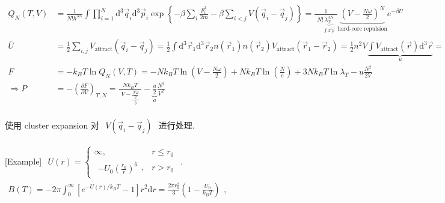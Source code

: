 \documentclass[../../main.tex]{subfiles}
\begin{document}
$\begin{aligned}
    Q_{N}(T,V) &= \frac{1}{N!h^{3N}}\int\prod_{i=1}^{N}\mathrm{d}^{3}\vec{q}_{i}\mathrm{d}^{3}\vec{p}_{i}\exp\left\{
        -\beta \sum_{i}\frac{p_{i}^{2}}{2m} - \beta \sum_{i<j}V(\vec{q}_{i}-\vec{q}_{j})
    \right\}= \frac{1}{\begin{aligned}
        N!\underbrace{\lambda_{T}^{3N}}_{\int\mathrm{d}^{3}\vec{p}}
    \end{aligned}}\underbrace{\left(V - \frac{N\omega}{2}\right)^{N}}_{\text{hard-core repulsion}}e^{-\beta \overline{U}}\\
    \overline{U} &= \frac{1}{2}\sum_{i,j}V_{\text{attract}}\left(\vec{q}_{i}-\vec{q}_{j}\right) = \frac{1}{2}\int\mathrm{d}^{3}\vec{r}_{1}\mathrm{d}^{3}\vec{r}_{2}n(\vec{r}_{1})n(\vec{r}_{2})V_{\text{attract}}(\vec{r}_{1}-\vec{r}_{2}) = \frac{1}{2} n^{2}V \underbrace{\int V_{\text{attract}}(\vec{r})\mathrm{d}^{3}\vec{r}}_{u} = \frac{1}{2}\frac{N^{2}}{V}u\\
    F &= -k_{B}T\ln{Q_{N}(V,T)} = -Nk_{B}T\ln{\left(V - \frac{N\omega}{2}\right)} + Nk_{B}T\ln{\left(\frac{N}{e}\right)} + 3Nk_{B}T\ln{\lambda_{T}} - u\frac{N^{2}}{2V}\\
    \Rightarrow P &= -\left(\frac{\partial F}{\partial V}\right)_{T,N} = \frac{Nk_{B}T}{\begin{aligned}
        V - \underbrace{\frac{N\omega}{2}}_{b}
    \end{aligned}} - \underbrace{\frac{u}{2}}_{a}\frac{N^{2}}{V^{2}}
\end{aligned}$

使用 cluster expansion 对 $\begin{aligned}
    V\left(\vec{q}_{i}-\vec{q}_{j}\right)
\end{aligned}$ 进行处理. 

[Example] $\begin{aligned}
    U(r) = \begin{cases}
        \infty, & r\leq r_{0}\\
        \begin{aligned}
            -U_{0}\left(\frac{r_{0}}{r}\right)^{6}
        \end{aligned}, & r > r_{0}
    \end{cases}
\end{aligned}$. $\begin{aligned}
    B(T) = -2\pi\int_{0}^{\infty}[e^{-U(r)/k_{B}T}-1]r^{2}\mathrm{d}r = \frac{2\pi r_{0}^{2}}{3}\left(1 - \frac{U_{0}}{k_{B}T}\right)
\end{aligned}$, 
\end{document}
